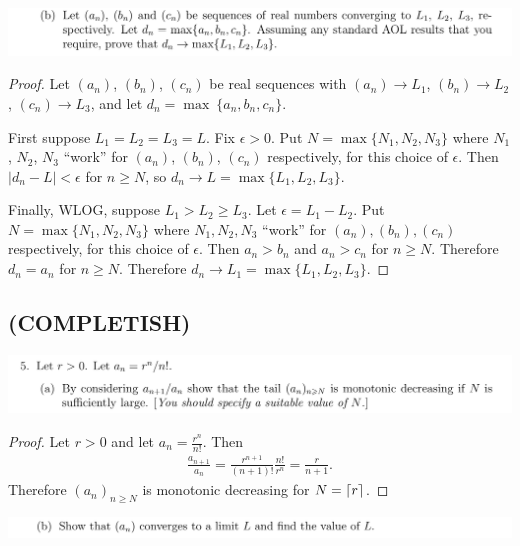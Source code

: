 \documentclass[12pt]{article}
\begin{document}
\begin{mdframed}
\includegraphics[width=400pt]{img/oxford-M2-analysis-I-4-4-b.png}
\end{mdframed}
\begin{proof}
  Let $(a_n)$, $(b_n)$, $(c_n)$ be real sequences with $(a_n) \to L_1$, $(b_n) \to L_2$,
  $(c_n) \to L_3$, and let $d_n = \max ~ \{a_n, b_n, c_n\}$.

  First suppose $L_1 = L_2 = L_3 = L$. Fix $\epsilon > 0$. Put $N = \max\{N_1, N_2, N_3\}$ where
  $N_1$, $N_2$, $N_3$ ``work'' for $(a_n)$, $(b_n)$, $(c_n)$ respectively, for this choice of
  $\epsilon$. Then $|d_n - L| < \epsilon$ for $n \geq N$, so $d_n \to L = \max\{L_1, L_2, L_3\}$.

  Finally, WLOG, suppose $L_1 > L_2 \geq L_3$. Let $\epsilon = L_1 - L_2$. Put
  $N = \max\{N_1, N_2, N_3\}$ where $N_1, N_2, N_3$ ``work'' for $(a_n), (b_n), (c_n)$
  respectively, for this choice of $\epsilon$. Then $a_n > b_n$ and $a_n > c_n$ for $n \geq
  N$. Therefore $d_n = a_n$ for $n \geq N$. Therefore $d_n \to L_1 = \max\{L_1, L_2, L_3\}$.

\end{proof}


\newpage
\subsection{(COMPLETISH)}
\begin{mdframed}
  \includegraphics[width=400pt]{img/oxford-M2-analysis-I-4-5-a.png}
\end{mdframed}

\begin{proof}
  Let $r > 0$ and let $a_n = \frac{r^n}{n!}$. Then
  \begin{align*}
    \frac{a_{n+1}}{a_n} = \frac{r^{n+1}}{(n+1)!}\frac{n!}{r^n} = \frac{r}{n+1}.
  \end{align*}
  Therefore $(a_n)_{n \geq N}$ is monotonic decreasing for $N = \lceil r\rceil$.
\end{proof}

\begin{mdframed}
  \includegraphics[width=400pt]{img/oxford-M2-analysis-I-4-5-b.png}
\end{mdframed}
\end{document}
